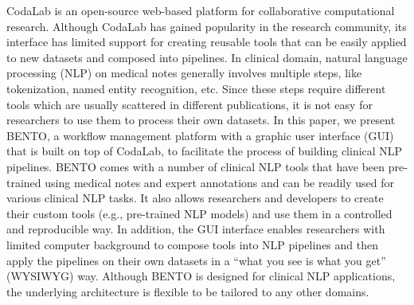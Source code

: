 CodaLab is an open-source web-based platform for collaborative computational research. Although CodaLab has gained popularity in the research community, its interface has limited support for creating reusable tools that can be easily applied to new datasets and composed into pipelines. In clinical domain, natural language processing (NLP) on medical notes generally involves multiple steps, like tokenization, named entity recognition, etc. Since these steps require different tools which are usually scattered in different publications, it is not easy for researchers to use them to process their own datasets. In this paper, we present BENTO, a workflow management platform with a graphic user interface (GUI) that is built on top of CodaLab, to facilitate the process of building clinical NLP pipelines. BENTO comes with a number of clinical NLP tools that have been pre-trained using medical notes and expert annotations and can be readily used for various clinical NLP tasks. It also allows researchers and developers to create their custom tools (e.g., pre-trained NLP models) and use them in a controlled and reproducible way. In addition, the GUI interface enables researchers with limited computer background to compose tools into NLP pipelines and then apply the pipelines on their own datasets in a ``what you see is what you get'' (WYSIWYG) way. Although BENTO is designed for clinical NLP applications, the underlying architecture is flexible to be tailored to any other domains.
